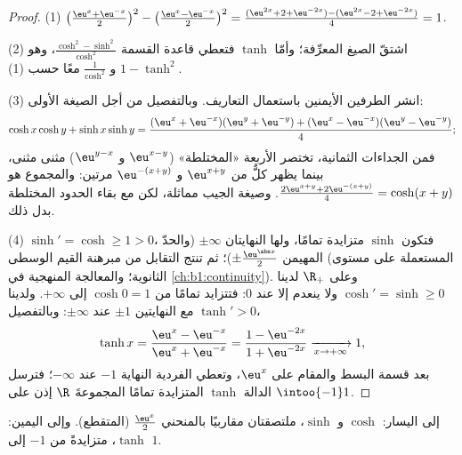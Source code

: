 \begin{proof}
(1) $\bigl(\frac{\eu^x + \eu^{-x}}{2}\bigr)^2 - \bigl(\frac{\eu^x -
\eu^{-x}}{2}\bigr)^2 = \frac{(\eu^{2x} + 2 + \eu^{-2x}) - (\eu^{2x} -
2 + \eu^{-2x})}{4} = 1$.

(2) اشتقّ الصيغ المعرِّفة؛ وأمّا $\tanh$ فتعطي قاعدة القسمة
$\frac{\cosh^2 - \sinh^2}{\cosh^2}$، وهو $1 - \tanh^2$ و
$\frac{1}{\cosh^2}$ معًا حسب (1).

(3) انشر الطرفين الأيمنين باستعمال التعاريف. وبالتفصيل
من أجل الصيغة الأولى:
\[
\cosh x\cosh y + \sinh x\sinh y
= \frac{(\eu^x + \eu^{-x})(\eu^y + \eu^{-y})
+ (\eu^x - \eu^{-x})(\eu^y - \eu^{-y})}{4} ;
\]
فمن الجداءات الثمانية، تختصر الأربعة «المختلطة»
($\eu^{x-y}$ و $\eu^{y-x}$) مثنى مثنى، بينما يظهر كلٌّ من
$\eu^{x+y}$ و $\eu^{-(x+y)}$ مرتين:
والمجموع هو $\frac{2\eu^{x+y} + 2\eu^{-(x+y)}}{4} = \cosh(x+y)$.
وصيغة الجيب مماثلة، لكن مع بقاء الحدود المختلطة بدل ذلك.

(4) $\sinh' = \cosh \geq 1 > 0$، فتكون $\sinh$ متزايدة تمامًا،
ولها النهايتان $\pm\infty$ (والحدّ المهيمن $\pm\frac{\eu^{\abs
x}}{2}$)؛ ثم تنتج  التقابل من مبرهنة القيم
الوسطى (المستعملة على مستوى الثانوية؛ والمعالجة المنهجية في
\cref{ch:b1:continuity}). وعلى $\R_+$ لدينا $\cosh' = \sinh \geq 0$
ولا ينعدم إلا عند $0$: فتتزايد تمامًا من $\cosh 0 = 1$ إلى
$+\infty$. ولدينا $\tanh' > 0$ مع النهايتين $\pm 1$ عند $\pm\infty$:
وبالتفصيل،
\[
\tanh x = \frac{\eu^x - \eu^{-x}}{\eu^x + \eu^{-x}}
= \frac{1 - \eu^{-2x}}{1 + \eu^{-2x}}
\xrightarrow[x \to +\infty]{} 1 ,
\]
بعد قسمة البسط والمقام على $\eu^x$، وتعطي الفردية
النهاية $-1$ عند $-\infty$؛ فترسل الدالة $\tanh$ المتزايدة
تمامًا المجموعةَ $\R$ إذن على $\intoo{-1}1$.
\end{proof}

\begin{omfigure}

{\small إلى اليسار: $\cosh$ و $\sinh$، ملتصقتان مقاربيًا بالمنحني
$\frac{\eu^x}{2}$ (المتقطع). وإلى اليمين: $\tanh$، متزايدةً من $-1$ إلى
$1$.}
\end{omfigure}

